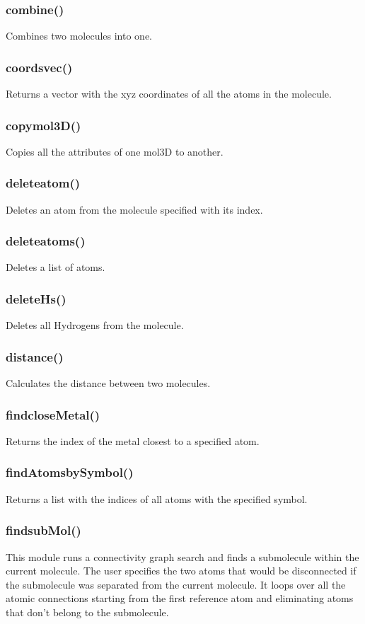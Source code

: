 \documentclass[a4paper,12pt]{assignment}
\begin{document}
\subsubsection{combine()}
Combines two molecules into one.
\subsubsection{coordsvec()}
Returns a vector with the xyz coordinates of all the atoms in the molecule.
\subsubsection{copymol3D()}
Copies all the attributes of one mol3D to another.
\subsubsection{deleteatom()}
Deletes an atom from the molecule specified with its index.
\subsubsection{deleteatoms()}
Deletes a list of atoms.
\subsubsection{deleteHs()}
Deletes all Hydrogens from the molecule.
\subsubsection{distance()}
Calculates the distance between two molecules.
\subsubsection{findcloseMetal()}
Returns the index of the metal closest to a specified atom.
\subsubsection{findAtomsbySymbol()}
Returns a list with the indices of all atoms with the specified symbol.
\subsubsection{findsubMol()}
This module runs a connectivity graph search and finds a submolecule within the current molecule. The user specifies the two atoms that would be disconnected if the submolecule was separated from the current molecule. It loops over all the atomic connections starting from the first reference atom and eliminating atoms that don't belong to the submolecule.
\end{document}
